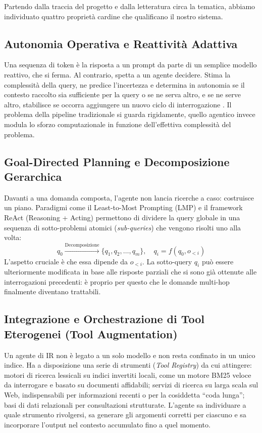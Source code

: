 Partendo dalla traccia del progetto e dalla letteratura circa la tematica, abbiamo individuato quattro proprietà cardine che qualificano il nostro sistema.

\subsection{Autonomia Operativa e Reattività Adattiva}
Una sequenza di token è la risposta a un prompt da parte di un semplice modello reattivo, che si ferma. Al contrario, spetta a un agente decidere. Stima la complessità della query, ne predice l'incertezza e determina in autonomia se il contesto raccolto sia sufficiente per la query o se ne serva altro, e se ne serve altro, stabilisce se occorra aggiungere un nuovo ciclo di interrogazione \cite{jeong2024adaptiverag}. Il problema della pipeline tradizionale si guarda rigidamente, quello agentico invece modula lo sforzo computazionale in funzione dell'effettiva complessità del problema.

\subsection{Goal-Directed Planning e Decomposizione Gerarchica}
Davanti a una domanda composta, l'agente non lancia ricerche a caso: costruisce un piano. Paradigmi come il Least-to-Most Prompting (LMP) \cite{zhou2022leasttomost} e il framework ReAct (Reasoning + Acting) \cite{yao2022react} permettono di dividere la query globale in una sequenza di sotto-problemi atomici (\textit{sub-queries}) che vengono risolti uno alla volta:
\begin{equation}
q_0 \xrightarrow{\text{Decomposizione}} \{q_1, q_2, \dots, q_m\}, \quad q_i = f(q_0, o_{<i})
\end{equation}
L'aspetto cruciale è che essa dipende da $o_{<i}$. La sotto-query $q_i$ può essere ulteriormente modificata in base alle risposte parziali che si sono già ottenute alle interrogazioni precedenti: è proprio per questo che le domande multi-hop finalmente diventano trattabili.

\subsection{Integrazione e Orchestrazione di Tool Eterogenei (Tool Augmentation)}
Un agente di IR non è legato a un solo modello e non resta confinato in un unico indice. Ha a disposizione una serie di strumenti (\textit{Tool Registry}) da cui attingere: motori di ricerca lessicali su indici invertiti locali, come un motore BM25 veloce da interrogare e basato su documenti affidabili; servizi di ricerca su larga scala sul Web, indispensabili per informazioni recenti o per la cosiddetta ``coda lunga''; basi di dati relazionali per consultazioni strutturate. L'agente sa individuare a quale strumento rivolgersi, sa generare gli argomenti corretti per ciascuno e sa incorporare l'output nel contesto accumulato fino a quel momento.

